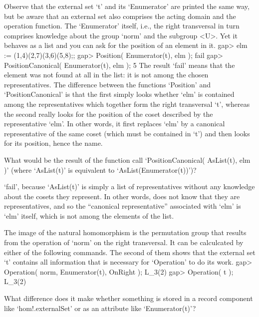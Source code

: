 Observe that the  external set `t' and  its `Enumerator' are  printed the
same way,  but be aware that an  external  set also comprises  the acting
domain and the  operation function.  The  `Enumerator' itself, i.e.,  the
right transversal in turn comprises  knowledge about the group `norm' and
the  subgroup <U>. Yet it   behaves as a  list and  you  can ask for  the
position of an element in it.
\beginexample
    gap> elm := (1,4)(2,7)(3,6)(5,8);;
    gap> Position( Enumerator(t), elm );
    fail
    gap> PositionCanonical( Enumerator(t), elm );
    5
\endexample
The result `fail'  means  that the element was   not found at all  in the
list: it is not among the chosen representatives. The difference
%
between the functions   `Position'  and `PositionCanonical' is   that the
first  simply looks whether  `elm' is contained among the representatives
which together form the right  transversal `t', whereas the second really
looks  for  the position of  the  coset  described  by the representative
`elm'.  In  other   words,  it  first    replaces `elm'  by  a  canonical
representative of  the same  coset (which must  be contained  in `t') and
then looks for its position, hence the name.

\exercise   What   would     be  the  result    of   the  function   call
`PositionCanonical( AsList(t), elm )' (where `AsList(t)' is equivalent to
`AsList(Enumerator(t))')?

\answer `fail', because `AsList(t)'  is simply a list of  representatives
without  any knowledge about the  cosets  they represent. In other words,
{\GAP}    does not  know  that  they   are   representatives, and so  the
``canonical representative'' associated with `elm' is `elm' itself, which
is not among the elements of the list.

The  image  of the natural  homomorphism   is the permutation  group that
results from the operation of `norm' on the right  transversal. It can be
calculcated by either of the following commands. The second of them shows
that the external set `t' contains all information  that is necessary for
`Operation' to do its work.
\beginexample
    gap> Operation( norm, Enumerator(t), OnRight );
    L_3(2)
    gap> Operation( t );
    L_3(2)
\endexample

\exercise What difference does  it make whether something  is stored in a
record  component   like `hom!.externalSet'   or   as  an attribute  like
`Enumerator(t)'?


